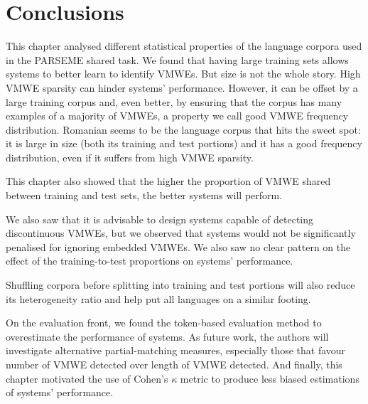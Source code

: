 \documentclass[output=paper
,modfonts
,nonflat,draftmode]{langsci/langscibook}
\begin{document}


\section{Conclusions}
\label{conclude}

This chapter analysed different statistical properties of the language corpora used in the PARSEME shared task. We found that having large training sets allows systems to better learn to identify VMWEs. But size is not the whole story. High VMWE sparsity can hinder systems' performance. However, it can be offset by a large training corpus and, even better, by ensuring that the corpus has many examples of a majority of VMWEs, a property we call good VMWE frequency distribution. Romanian seems to be the language corpus that hits the sweet spot: it is large in size (both its training and test portions) and it has a good frequency distribution, even if it suffers from high VMWE sparsity. 

This chapter also showed that the higher the proportion of VMWE shared between training and test sets, the better systems will perform.

We also saw that it is advisable to design systems capable of detecting discontinuous VMWEs, but we observed that systems would not be significantly penalised for ignoring embedded VMWEs. We also saw no clear pattern on the effect of the training-to-test proportions on systems' performance. 

Shuffling corpora before splitting into training and test portions will also reduce its heterogeneity ratio and help put all languages on a similar footing. 

On the evaluation front, we found the token-based evaluation method to overestimate the performance of systems. As future work, the authors will investigate alternative partial-matching measures, especially those that favour number of VMWE detected over length of VMWE detected. And finally, this chapter motivated the use of Cohen's $\kappa$ metric to produce less biased estimations of systems' performance.
\end{document}
